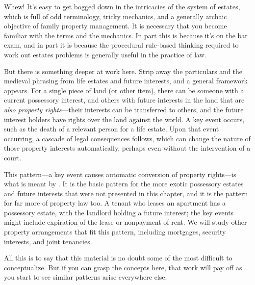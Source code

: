 Whew! It's easy to get bogged down in the intricacies of the system of estates,
which is full of odd terminology, tricky mechanics, and a generally archaic
objective of family property management. It is necessary that you become
familiar with the terms and the mechanics. In part this is because it's on the
bar exam, and in part it is because the procedural rule-based thinking required
to work out estates problems is generally useful in the practice of law.

But there is something deeper at work here. Strip away the particulars and the
medieval phrasing from life estates and future interests, and a general
framework appears. For a single piece of land (or other item), there can be
someone with a current possessory interest, and others with future interests in
the land that are \emph{also property rights}---their interests can be
transferred to others, and the future interest holders have rights over the
land against the world. A key event occurs, such as the death of a
relevant person for a life estate. Upon that event occurring, a cascade of legal
consequences follows, which can change the nature of those property interests
automatically, perhaps even without the intervention of a court.

This pattern---a key event causes automatic conversion of property
rights---is what is meant by . It is the basic pattern
for
the more exotic possessory estates and future interests that were not presented
in this chapter, and it is the pattern for far more of property law too. A
tenant who leases an apartment has a possessory estate, with the landlord
holding a future interest; the key events might include expiration of the
lease or nonpayment of rent. We will study other property arrangements that fit
this pattern, including mortgages, security interests, and joint tenancies. 

All this is to say that this material is no doubt some of the most difficult to
conceptualize. But if you can grasp the concepts here, that work will pay off as
you start to see similar patterns arise everywhere else.

